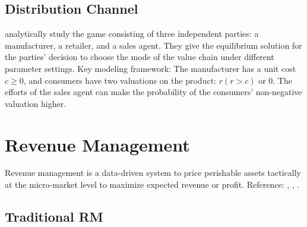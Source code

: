\documentclass[10pt]{report}
\begin{document}
\subsection{Distribution Channel}

\cite{kouvelis2020should} analytically study the game consisting of three independent parties: a manufacturer, a retailer, and a sales agent. They
give the equilibrium solution for the parties' decision to choose the mode of the value chain under different parameter settings. Key modeling framework:
The manufacturer has a unit cost $c\ge 0$, and consumers have two valuations on the product: $r(r>c)$ or $0$. The efforts of the sales agent can make the probability
of the consumers' non-negative valuation higher.

\clearpage
\section{Revenue Management}

Revenue management is a data-driven system to price perishable assets tactically at the micro-market level to maximize expected revenue or profit. Reference: \cite{gallegoRevenueManagementPricing2019}, \cite{Strauss2018}, \cite{Klein2020}.

\subsection{Traditional RM}

\end{document}
